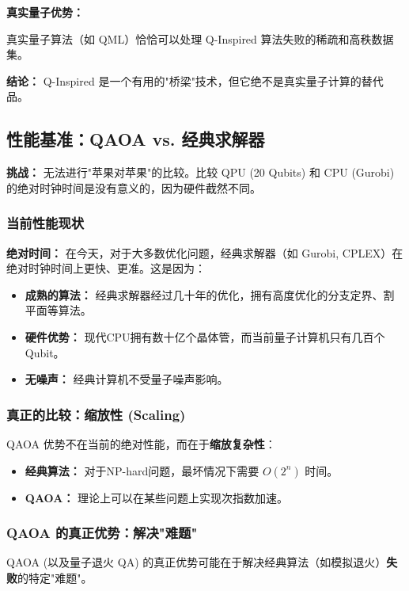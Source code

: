 \documentclass[11pt,a4paper]{article}
\begin{document}
\textbf{真实量子优势：}

真实量子算法（如 QML）恰恰可以处理 Q-Inspired 算法失败的稀疏和高秩数据集。

\textbf{结论：} Q-Inspired 是一个有用的"桥梁"技术，但它绝不是真实量子计算的替代品。

\subsection{性能基准：QAOA vs. 经典求解器}

\textbf{挑战：} 无法进行"苹果对苹果"的比较。比较 QPU (20 Qubits) 和 CPU (Gurobi) 的绝对时钟时间是没有意义的，因为硬件截然不同。

\subsubsection{当前性能现状}

\textbf{绝对时间：} 在今天，对于大多数优化问题，经典求解器（如 Gurobi, CPLEX）在绝对时钟时间上更快、更准。这是因为：

\begin{itemize}
\item \textbf{成熟的算法：} 经典求解器经过几十年的优化，拥有高度优化的分支定界、割平面等算法。
\item \textbf{硬件优势：} 现代CPU拥有数十亿个晶体管，而当前量子计算机只有几百个Qubit。
\item \textbf{无噪声：} 经典计算机不受量子噪声影响。
\end{itemize}

\subsubsection{真正的比较：缩放性 (Scaling)}

QAOA 优势不在当前的绝对性能，而在于\textbf{缩放复杂性}：

\begin{itemize}
\item \textbf{经典算法：} 对于NP-hard问题，最坏情况下需要 $O(2^n)$ 时间。
\item \textbf{QAOA：} 理论上可以在某些问题上实现次指数加速。
\end{itemize}

\subsubsection{QAOA 的真正优势：解决"难题"}

QAOA (以及量子退火 QA) 的真正优势可能在于解决经典算法（如模拟退火）\textbf{失败}的特定"难题"。
\end{document}

